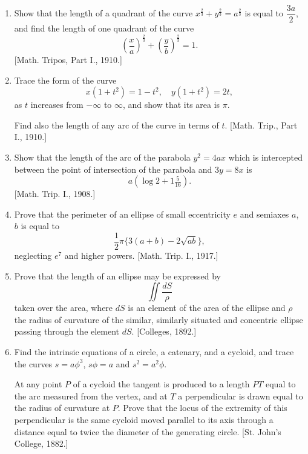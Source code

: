 \documentclass[11pt, a4paper]{article}
\newcommand{\source}[1]{\hfill\textnormal{[#1]}}
\begin{document}
\begin{enumerate}[leftmargin=2em]
What happens when $c=0$? \source{Oxf. I. P., 1915.}

\item Show that the length of a quadrant of the curve $x^{\frac23}+y^{\frac23}=a^{\frac23}$ is equal to $\dfrac{3a}{2}$, and find the length of one quadrant of the curve
\[
\left(\frac{x}{a}\right)^{\frac23}+\left(\frac{y}{b}\right)^{\frac23}=1.
\]
\source{Math. Tripos, Part I., 1910.}

\item Trace the form of the curve
\[
x(1+t^2)=1-t^2,\quad y(1+t^2)=2t,
\]
as $t$ increases from $-\infty$ to $\infty$, and show that its area is $\pi$.

Find also the length of any arc of the curve in terms of $t$. \source{Math. Trip., Part I., 1910.}

\item Show that the length of the arc of the parabola $y^2=4ax$ which is intercepted between the point of intersection of the parabola and $3y=8x$ is
\[
a\left(\log2+1\tfrac{5}{16}\right).
\]
\source{Math. Trip. I., 1908.}

\item Prove that the perimeter of an ellipse of small eccentricity $e$ and semiaxes $a$, $b$ is equal to
\[
\frac12\pi\{3(a+b)-2\sqrt{ab}\},
\]
neglecting $e^7$ and higher powers. \source{Math. Trip. I., 1917.}

\item Prove that the length of an ellipse may be expressed by
\[
\iint\frac{dS}{\rho}
\]
taken over the area, where $dS$ is an element of the area of the ellipse and $\rho$ the radius of curvature of the similar, similarly situated and concentric ellipse passing through the element $dS$. \source{Colleges, 1892.}

\item Find the intrinsic equations of a circle, a catenary, and a cycloid, and trace the curves $s=a\phi^3$, $s\phi=a$ and $s^2=a^2\phi$.

At any point $P$ of a cycloid the tangent is produced to a length $PT$ equal to the arc measured from the vertex, and at $T$ a perpendicular is drawn equal to the radius of curvature at $P$. Prove that the locus of the extremity of this perpendicular is the same cycloid moved parallel to its axis through a distance equal to twice the diameter of the generating circle. \source{St. John's College, 1882.}

\end{enumerate}

\newpage
\end{document}
